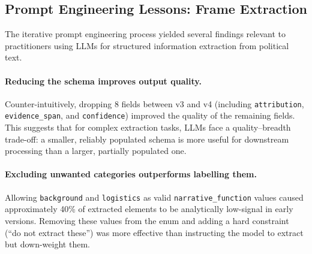 \documentclass[10pt, a4paper]{article}
\begin{document}
\subsection{Prompt Engineering Lessons: Frame Extraction}
\label{sec:prompt_lessons}

The iterative prompt engineering process yielded several findings relevant to practitioners using LLMs for structured information extraction from political text.


\paragraph{Reducing the schema improves output quality.}
Counter-intuitively, dropping 8 fields between v3 and v4 (including \texttt{attribution}, \texttt{evidence\_span}, and \texttt{confidence}) improved the quality of the remaining fields. This suggests that for complex extraction tasks, LLMs face a quality--breadth trade-off: a smaller, reliably populated schema is more useful for downstream processing than a larger, partially populated one.

\paragraph{Excluding unwanted categories outperforms labelling them.}
Allowing \texttt{background} and \texttt{logistics} as valid \texttt{narrative\_function} values caused approximately 40\% of extracted elements to be analytically low-signal in early versions. Removing these values from the enum and adding a hard constraint (``do not extract these'') was more effective than instructing the model to extract but down-weight them.
\end{document}
